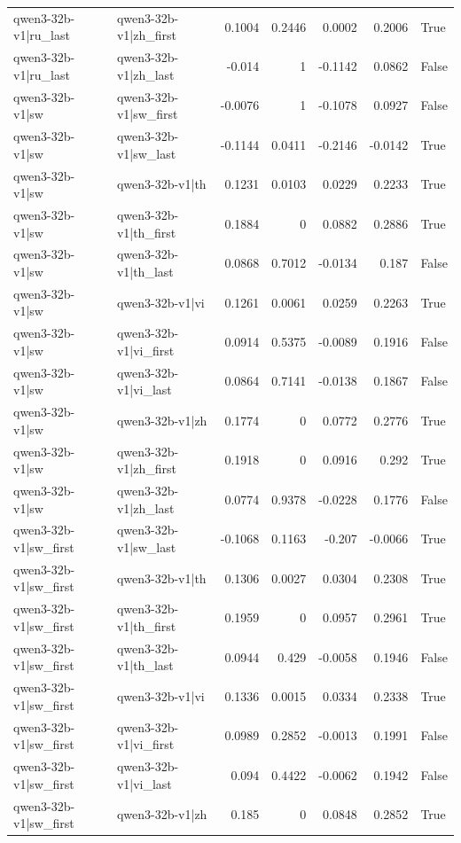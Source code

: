 \begin{table}
\begin{tabular}{l l r r r r l}
qwen3-32b-v1|ru_last & qwen3-32b-v1|zh_first & 0.1004 & 0.2446 & 0.0002 & 0.2006 & True \\
qwen3-32b-v1|ru_last & qwen3-32b-v1|zh_last & -0.014 & 1 & -0.1142 & 0.0862 & False \\
qwen3-32b-v1|sw & qwen3-32b-v1|sw_first & -0.0076 & 1 & -0.1078 & 0.0927 & False \\
qwen3-32b-v1|sw & qwen3-32b-v1|sw_last & -0.1144 & 0.0411 & -0.2146 & -0.0142 & True \\
qwen3-32b-v1|sw & qwen3-32b-v1|th & 0.1231 & 0.0103 & 0.0229 & 0.2233 & True \\
qwen3-32b-v1|sw & qwen3-32b-v1|th_first & 0.1884 & 0 & 0.0882 & 0.2886 & True \\
qwen3-32b-v1|sw & qwen3-32b-v1|th_last & 0.0868 & 0.7012 & -0.0134 & 0.187 & False \\
qwen3-32b-v1|sw & qwen3-32b-v1|vi & 0.1261 & 0.0061 & 0.0259 & 0.2263 & True \\
qwen3-32b-v1|sw & qwen3-32b-v1|vi_first & 0.0914 & 0.5375 & -0.0089 & 0.1916 & False \\
qwen3-32b-v1|sw & qwen3-32b-v1|vi_last & 0.0864 & 0.7141 & -0.0138 & 0.1867 & False \\
qwen3-32b-v1|sw & qwen3-32b-v1|zh & 0.1774 & 0 & 0.0772 & 0.2776 & True \\
qwen3-32b-v1|sw & qwen3-32b-v1|zh_first & 0.1918 & 0 & 0.0916 & 0.292 & True \\
qwen3-32b-v1|sw & qwen3-32b-v1|zh_last & 0.0774 & 0.9378 & -0.0228 & 0.1776 & False \\
qwen3-32b-v1|sw_first & qwen3-32b-v1|sw_last & -0.1068 & 0.1163 & -0.207 & -0.0066 & True \\
qwen3-32b-v1|sw_first & qwen3-32b-v1|th & 0.1306 & 0.0027 & 0.0304 & 0.2308 & True \\
qwen3-32b-v1|sw_first & qwen3-32b-v1|th_first & 0.1959 & 0 & 0.0957 & 0.2961 & True \\
qwen3-32b-v1|sw_first & qwen3-32b-v1|th_last & 0.0944 & 0.429 & -0.0058 & 0.1946 & False \\
qwen3-32b-v1|sw_first & qwen3-32b-v1|vi & 0.1336 & 0.0015 & 0.0334 & 0.2338 & True \\
qwen3-32b-v1|sw_first & qwen3-32b-v1|vi_first & 0.0989 & 0.2852 & -0.0013 & 0.1991 & False \\
qwen3-32b-v1|sw_first & qwen3-32b-v1|vi_last & 0.094 & 0.4422 & -0.0062 & 0.1942 & False \\
qwen3-32b-v1|sw_first & qwen3-32b-v1|zh & 0.185 & 0 & 0.0848 & 0.2852 & True \\

\end{tabular}
\end{table}
